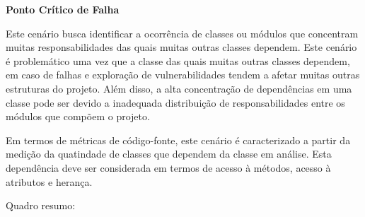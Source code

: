 %

\textbf{Ponto Crítico de Falha}

%

Este cenário busca identificar a ocorrência de classes ou módulos que concentram muitas responsabilidades das quais muitas outras classes dependem. Este cenário é problemático uma vez que a classe das quais muitas outras classes dependem, em caso de falhas e exploração de vulnerabilidades tendem a afetar muitas outras estruturas do projeto. Além disso, a alta concentração de dependências em uma classe pode ser devido a inadequada distribuição de responsabilidades entre os módulos que compõem o projeto.

%

Em termos de métricas de código-fonte, este cenário é caracterizado a partir da medição da quatindade de classes que dependem da classe em análise. Esta dependência deve ser considerada em termos de acesso à métodos, acesso à atributos e herança. 

%

Quadro resumo:

